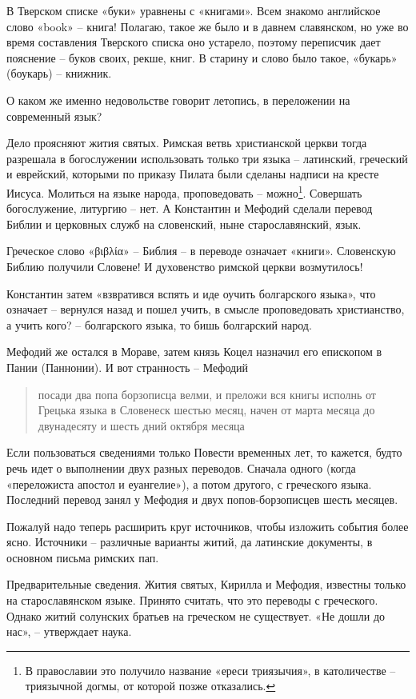 \documentclass[a5paper,11pt,openany]{article}
\begin{document}
В Тверском списке «буки» уравнены с «книгами». Всем знакомо английское слово «book» – книга! Полагаю, такое же было и в давнем славянском, но уже во время составления Тверского списка оно устарело, поэтому переписчик дает пояснение – буков своих, рекше, книг. В старину и слово было такое, «букарь» (боукарь) – книжник.

О каком же именно недовольстве говорит летопись, в переложении на современный язык?

Дело проясняют жития святых. Римская ветвь христианской церкви тогда разрешала в богослужении использовать только три языка – латинский, греческий и еврейский, которыми по приказу Пилата были сделаны надписи на кресте Иисуса. Молиться на языке народа, проповедовать – можно\footnote{В православии это получило название «ереси триязычия», в католичестве – триязычной догмы, от которой позже отказались.}. Совершать богослужение, литургию – нет. А Константин и Мефодий сделали перевод Библии и церковных служб на словенский, ныне старославянский, язык.

Греческое слово «βιβλία» – Библия – в переводе означает «книги». Словенскую Библию получили Словене! И духовенство римской церкви возмутилось!
 
Константин затем «взвратився вспять и иде оучить болгарского языка», что означает  – вернулся назад и пошел учить, в смысле проповедовать христианство, а учить кого? – болгарского языка, то бишь болгарский народ.

Мефодий же остался в Мораве, затем князь Коцел назначил его епископом в Пании (Паннонии). И вот странность – Мефодий

\begin{quotation}
посади два попа борзописца велми, и преложи вся книгы исполнь от Грецька языка в Словенеск шестью месяц, начен от марта месяца до двунадесяту и шесть дний октября месяца
\end{quotation}

Если пользоваться сведениями только Повести временных лет, то кажется, будто речь идет о выполнении двух разных переводов. Сначала одного (когда «переложиста апостол и еуангелие»), а потом другого, с греческого языка. Последний перевод занял у Мефодия и двух попов-борзописцев шесть месяцев.

Пожалуй надо теперь расширить круг источников, чтобы изложить события более ясно. Источники – различные варианты житий, да латинские документы, в основном письма римских пап.

Предварительные сведения. Жития святых, Кирилла и Мефодия, известны только на старославянском языке. Принято считать, что это переводы с греческого. Однако житий солунских братьев на греческом не существует. «Не дошли до нас», – утверждает наука.
\end{document}
